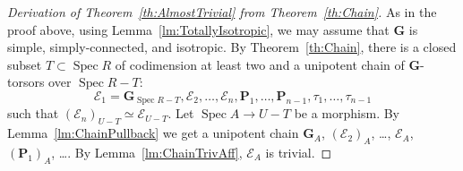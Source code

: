 \documentclass[11pt]{amsart}
\DeclareMathOperator\Spec{{Spec}}
\theoremstyle{plain}
\theoremstyle{definition}
\theoremstyle{remark}
\newcommand\cE{{\mathcal{E}}}
\newcommand\bG{{\mathbf G}}
\newcommand\bP{{\mathbf P}}
\begin{document}
\begin{proof}[Derivation of Theorem~\ref{th:AlmostTrivial} from Theorem~\ref{th:Chain}]
    As in the proof above, using Lemma~\ref{lm:TotallyIsotropic}, we may assume that $\bG$ is simple, simply-connected, and isotropic. By Theorem~\ref{th:Chain}, there is a closed subset $T\subset\Spec R$ of codimension at least two and a unipotent chain of $\bG$-torsors over $\Spec R-T$:
  \[
    \cE_1=\bG_{\Spec R-T}, \cE_2, \ldots, \cE_n, \bP_1, \ldots, \bP_{n-1},\tau_1,\ldots,\tau_{n-1}
  \]
  such that $(\cE_n)_{U-T}\simeq\cE_{U-T}$. Let $\Spec A\to U-T$ be a morphism. By Lemma~\ref{lm:ChainPullback} we get a unipotent chain $\bG_A$, $(\cE_2)_A$, \ldots, $\cE_A$, $(\bP_1)_A$, \ldots. By Lemma~\ref{lm:ChainTrivAff}, $\cE_A$ is trivial.
\end{proof}
\end{document}
